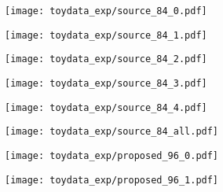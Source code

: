\documentclass{article} \usepackage{iclr2018_conference,times}
\begin{document}
\begin{figure}[t]
 \begin{minipage}{0.16\hsize}
  \begin{center}
   \texttt{[image: toydata\_exp/source\_84\_0.pdf]}
  
  \end{center}
 \end{minipage}
 \begin{minipage}{0.16\hsize}
 \begin{center}
  \texttt{[image: toydata\_exp/source\_84\_1.pdf]}
 \end{center}
 \end{minipage}
 \begin{minipage}{0.16\hsize}
 \begin{center}
  \texttt{[image: toydata\_exp/source\_84\_2.pdf]}
 \end{center}
 \end{minipage}
  \begin{minipage}{0.16\hsize}
 \begin{center}
  \texttt{[image: toydata\_exp/source\_84\_3.pdf]}
 \end{center}
 \end{minipage}
  \begin{minipage}{0.16\hsize}
 \begin{center}
  \texttt{[image: toydata\_exp/source\_84\_4.pdf]}
 \end{center}
  \end{minipage}
    \begin{minipage}{0.16\hsize}
 \begin{center}
  \texttt{[image: toydata\_exp/source\_84\_all.pdf]}
 \end{center}
 \end{minipage}
 \begin{minipage}{0.16\hsize}
  \begin{center}
   \texttt{[image: toydata\_exp/proposed\_96\_0.pdf]}
  \end{center}
 \end{minipage}
 \begin{minipage}{0.16\hsize}
 \begin{center}
  \texttt{[image: toydata\_exp/proposed\_96\_1.pdf]}
 \end{center}
 \end{minipage}
 \begin{minipage}{0.16\hsize}
 \begin{center}

\end{center}
\end{minipage}
\end{figure}
\end{document}
